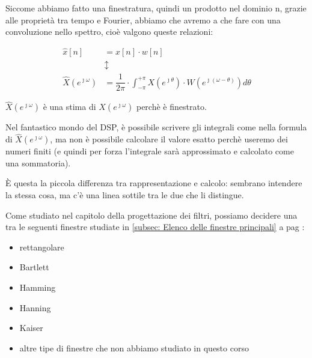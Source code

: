 Siccome abbiamo fatto una finestratura, quindi un prodotto nel dominio n, grazie alle proprietà tra tempo e Fourier, 
abbiamo che avremo a che fare con una convoluzione nello spettro, cioè valgono queste relazioni: 

{
    \Large 
    \begin{equation}
        \begin{split}
            \hat{x} \left[ n\right]
            &= 
            x \left[ n\right]
            \cdot 
            w \left[ n\right]
            \\
            &\updownarrow 
            \\
            \hat{X} \left(e^{\jmath \omega}\right)
            &= 
            \dfrac{1}{2 \pi}
            \cdot 
            \int_{- \pi}^{+ \pi}
            X \left(e^{\jmath \theta}\right)
            \cdot 
            W \left(e^{\jmath \left(\omega - \theta\right)}\right)
            d \theta
        \end{split}
    \end{equation}
}

$\hat{X} \left(e^{\jmath \omega}\right)$ è una stima di $X \left(e^{\jmath \omega}\right)$ perchè è finestrato. \newline 

\begin{tcolorbox}
Nel fantastico mondo del DSP, è possibile scrivere gli integrali come nella formula di $\hat{X} \left(e^{\jmath \omega}\right)$, 
ma non è possibile calcolare il valore esatto perchè useremo dei numeri finiti (e quindi per forza l'integrale sarà approssimato e calcolato come una sommatoria). \newline 

È questa la piccola differenza tra rappresentazione e calcolo: sembrano intendere la stessa cosa, ma c'è una linea sottile tra le due che li distingue. 
\end{tcolorbox}

Come studiato nel capitolo della progettazione dei filtri, possiamo decidere una tra le seguenti finestre studiate in \ref{subsec: Elenco delle finestre principali}  a pag \pageref{subsec: Elenco delle finestre principali}: 

\begin{itemize}
    \item rettangolare 
    \item Bartlett 
    \item Hamming 
    \item Hanning 
    \item Kaiser 
    \item altre tipe di finestre che non abbiamo studiato in questo corso 
\end{itemize}

